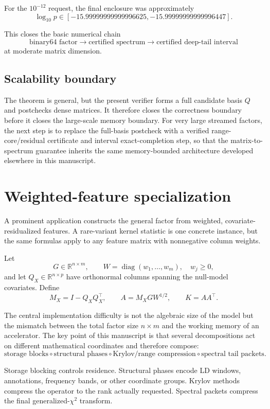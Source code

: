 \documentclass[11pt]{article}
\theoremstyle{definition}
\theoremstyle{remark}
\begin{document}
For the \(10^{-12}\) request, the final enclosure was approximately
\[
\log_{10}p
\in
[-15.99999999999996625,
 -15.99999999999996447].
\]

This closes the basic numerical chain
\[
\boxed{
\text{binary64 factor}
\longrightarrow
\text{certified spectrum}
\longrightarrow
\text{certified deep-tail interval}
}
\]
at moderate matrix dimension.

\subsection{Scalability boundary}

The theorem is general, but the present verifier forms a full candidate
basis \(Q\) and postchecks dense matrices.  It therefore closes the correctness
boundary before it closes the large-scale memory boundary.  For very large
streamed factors, the next step is to replace the full-basis postcheck with a
verified range-core/residual certificate and interval exact-completion step,
so that the matrix-to-spectrum guarantee inherits the same memory-bounded
architecture developed elsewhere in this manuscript.


\section{Weighted-feature specialization}

A prominent application constructs the general factor from weighted,
covariate-residualized features.  A rare-variant kernel statistic is one concrete instance, but the same
formulas apply to any feature matrix with nonnegative column weights.

Let
\[
G\in\mathbb R^{n\times m},
\qquad
W=\operatorname{diag}(w_1,\ldots,w_m),
\quad w_j\ge 0,
\]
and let \(Q_X\in\mathbb R^{n\times p}\) have orthonormal columns spanning
the null-model covariates.  Define
\[
M_X=I-Q_XQ_X^\top,
\qquad
A=M_XGW^{1/2},
\qquad
K=AA^\top.
\]

The central implementation difficulty is not the algebraic size of the
model but the mismatch between the total factor size \(n\times m\) and the
working memory of an accelerator.  The key point of this manuscript is that
several decompositions act on different mathematical coordinates and therefore
compose:
\[
\boxed{
\text{storage blocks}
\circ
\text{structural phases}
\circ
\text{Krylov/range compression}
\circ
\text{spectral tail packets}.
}
\]

Storage blocking controls residence.  Structural phases encode LD windows,
annotations, frequency bands, or other coordinate groups.  Krylov methods
compress the operator to the rank actually requested.  Spectral packets
compress the final generalized-\(\chi^2\) transform.
\end{document}

